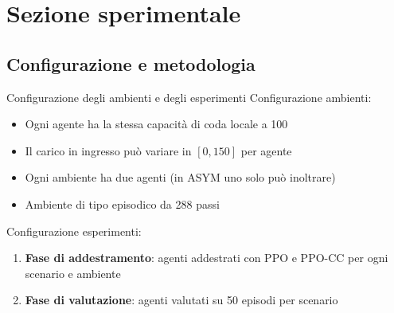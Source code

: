 \documentclass[]{beamer}
\begin{document}
\section{Sezione sperimentale}

\subsection{Configurazione e metodologia}

\begin{frame}{Configurazione degli ambienti e degli esperimenti}
    Configurazione ambienti:
    \begin{itemize}
        \item Ogni agente ha la stessa capacità di coda locale a 100
        \medskip

        \item Il carico in ingresso può variare in $[0, 150]$ per agente
        \medskip

        \item Ogni ambiente ha due agenti (in ASYM uno solo può inoltrare)
        \medskip

        \item Ambiente di tipo episodico da 288 passi
    \end{itemize}

    \medskip

    Configurazione esperimenti:
    \begin{enumerate}
        \item \textbf{Fase di addestramento}: agenti addestrati con PPO e PPO-CC per ogni scenario e ambiente

        \item \textbf{Fase di valutazione}: agenti valutati su 50 episodi per scenario
    \end{enumerate}
\end{frame}
\end{document}
